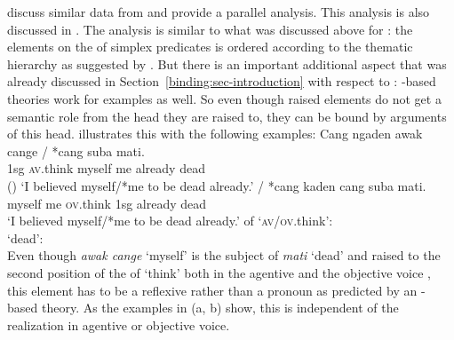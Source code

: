 \documentclass[output=paper,biblatex,babelshorthands,newtxmath,draftmode,colorlinks,citecolor=brown]{langscibook}
\begin{document}
\citet{WA98a-u} discuss similar data from  and provide a parallel analysis. This
analysis is also discussed in . The
analysis is similar to what was discussed above for : the elements on the \argstl of
simplex predicates is ordered according to the thematic hierarchy as suggested by
\citet{Jackendoff72a-u}. But there is an important additional aspect that was already discussed in
Section~\ref{binding:sec-introduction} with respect to : \argst-based theories work for  examples as
well. So even though raised elements do not get a semantic role from the head they are raised to,
they can be bound by arguments of this head. \citet[--190]{Wechsler99a} illustrates this with the
following examples:
\eal
\ex
\gll Cang ngaden           {awak cange} /  *cang          suba    mati.\\
     1sg \textsc{av}.think myself    {} \hphantom{*}me already dead\\\hfill()
\glt `I believed myself/*me to be dead already.'
\ex
{} / *cang           kaden             cang suba    mati.\\
     myself       {} \hphantom{*}me \textsc{ov}.think 1sg  already dead\\
\glt `I believed myself/*me to be dead already.'
\ex \argst of `\textsc{av}/\textsc{ov}.think':\\
\ex `dead':\\
\zl
Even though \emph{awak cange} `myself' is the subject of \emph{mati} `dead' and raised to the second
position of the \argst of `think' both in the agentive and the objective voice , this element has to be
a reflexive rather than a pronoun as predicted by an \argst-based theory. As the examples in
(a, b) show, this is independent of the realization in agentive or objective voice.
\end{document}
